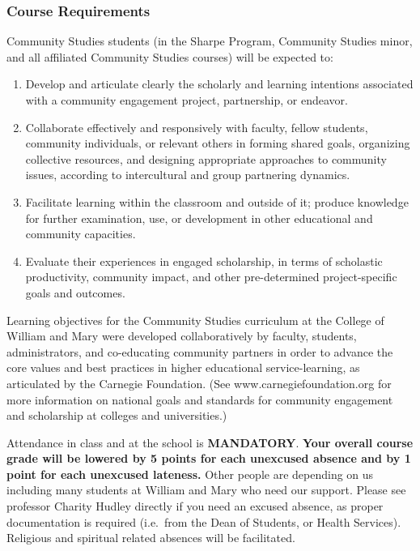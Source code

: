 \documentclass[]{article}
\providecommand{\tightlist}{%
  \setlength{\itemsep}{0pt}\setlength{\parskip}{0pt}}
\begin{document}
\subsubsection{Course Requirements}\label{course-requirements}

Community Studies students (in the Sharpe Program, Community Studies
minor, and all affiliated Community Studies courses) will be expected
to:

\begin{enumerate}
\def\labelenumi{\arabic{enumi}.}
\tightlist
\item
  Develop and articulate clearly the scholarly and learning intentions
  associated with a community engagement project, partnership, or
  endeavor.
\item
  Collaborate effectively and responsively with faculty, fellow
  students, community individuals, or relevant others in forming shared
  goals, organizing collective resources, and designing appropriate
  approaches to community issues, according to intercultural and group
  partnering dynamics.
\item
  Facilitate learning within the classroom and outside of it; produce
  knowledge for further examination, use, or development in other
  educational and community capacities.
\item
  Evaluate their experiences in engaged scholarship, in terms of
  scholastic productivity, community impact, and other pre-determined
  project-specific goals and outcomes.
\end{enumerate}

Learning objectives for the Community Studies curriculum at the College
of William and Mary were developed collaboratively by faculty, students,
administrators, and co-educating community partners in order to advance
the core values and best practices in higher educational
service-learning, as articulated by the Carnegie Foundation. (See
www.carnegiefoundation.org for more information on national goals and
standards for community engagement and scholarship at colleges and
universities.)

Attendance in class and at the school is \textbf{MANDATORY}.
\textbf{Your overall course grade will be lowered by 5 points for each
unexcused absence and by 1 point for each unexcused lateness.} Other
people are depending on us including many students at William and Mary
who need our support. Please see professor Charity Hudley directly if
you need an excused absence, as proper documentation is required
(i.e.~from the Dean of Students, or Health Services). Religious and
spiritual related absences will be facilitated.
\end{document}
